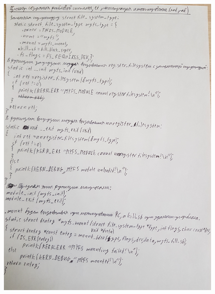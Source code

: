 \documentclass[a4paper,12pt]{article}
\begin{document}
	\begin{figure}[h!]
		\begin{center}
			{\includegraphics[scale = 0.9,  angle = 180]{4.jpg}}
			\label{4}
		\end{center}
	\end{figure}


	
\end{document}
